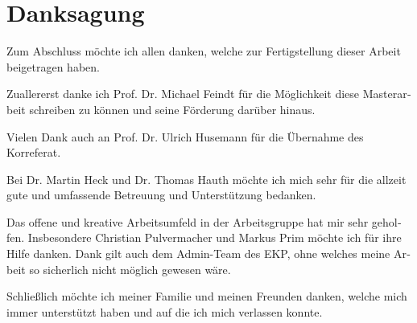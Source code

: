 \chapter*{Danksagung}
\begin{otherlanguage}{ngerman}
Zum Abschluss möchte ich allen danken, welche zur Fertigstellung dieser Arbeit beigetragen haben.

Zuallererst danke ich Prof. Dr. Michael Feindt für die Möglichkeit diese Masterarbeit schreiben zu können und seine Förderung darüber hinaus.

Vielen Dank auch an Prof. Dr. Ulrich Husemann für die Übernahme des Korreferat.

Bei Dr. Martin Heck und Dr. Thomas Hauth möchte ich mich sehr für die allzeit gute und umfassende Betreuung und Unterstützung bedanken.

Das offene und kreative Arbeitsumfeld in der Arbeitsgruppe hat mir sehr geholfen. Insbesondere Christian Pulvermacher und Markus Prim möchte ich für ihre Hilfe danken. Dank gilt auch dem Admin-Team des EKP, ohne welches meine Arbeit so sicherlich nicht möglich gewesen wäre.

Schließlich möchte ich meiner Familie und meinen Freunden danken, welche mich immer unterstützt haben und auf die ich mich verlassen konnte.
\end{otherlanguage}
